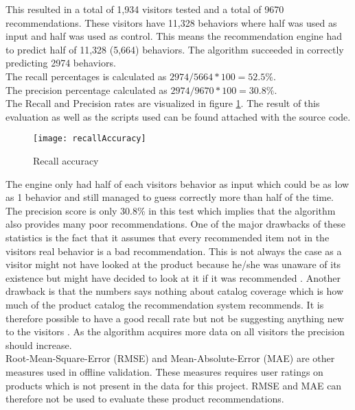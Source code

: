 This resulted in a total of 1,934 visitors tested and a total of 9670 recommendations. These visitors have 11,328 behaviors where half was used as input and half was used as control. This means the recommendation engine had to predict half of 11,328 (5,664) behaviors. The algorithm succeeded in correctly predicting 2974 behaviors.  \\
The recall percentages is calculated as \begin{math}2974/5664*100=52.5\%\end{math}. \\ The precision percentage calculated as \begin{math}2974/9670*100=30.8\%\end{math}. \\
The Recall and Precision rates are visualized in figure \ref{recallAccuracy}. The result of this evaluation as well as the scripts used can be found attached with the source code. \\
\begin{figure}[H]
\centering
\texttt{[image: recallAccuracy]}
\caption{Recall accuracy}
\label{recallAccuracy}
\end{figure}
The engine only had half of each visitors behavior as input which could be as low as 1 behavior and still managed to guess correctly more than half of the time.
The precision score is only 30.8\% in this test which implies that the algorithm also provides many poor recommendations. One of the major drawbacks of these statistics is the fact that it assumes that every recommended item not in the visitors real behavior is a bad recommendation. This is not always the case as a visitor might not have looked at the product because he/she was unaware of its existence but might have decided to look at it if it was recommended \cite{evaluatingRecommender}. Another drawback is that the numbers says nothing about catalog coverage which is how much of the product catalog the recommendation system recommends. It is therefore possible to have a good recall rate but not be suggesting anything new to the visitors \cite{eval}.
As the algorithm acquires more data on all visitors the precision should increase.\\
Root-Mean-Square-Error (RMSE) and Mean-Absolute-Error (MAE) \cite{rmseAndmae} are other measures used in offline validation. These measures requires user ratings on products which is not present in the data for this project. RMSE and MAE can therefore not be used to evaluate these product recommendations. \\
